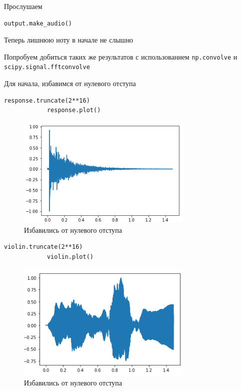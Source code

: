 \documentclass[a4paper,12pt]{article}
\begin{document}
\begin{enumerate}
		Прослушаем
		\begin{lstlisting}[caption=Прослушивание результата]
			output.make_audio()
		\end{lstlisting}
	
		Теперь лишнюю ноту в начале не слышно
		
		Попробуем добиться таких же результатов с использованием \texttt{np.convolve} и \texttt{scipy.signal.fftconvolve}
		
		Для начала, избавимся от нулевого отступа
		\begin{lstlisting}[caption=Избавляемся от нулевого отступа]
			response.truncate(2**16)
			response.plot()
		\end{lstlisting}
		\begin{figure}[H]
			\centering
			\includegraphics[width=0.75\textwidth]{1_5.png}
			\caption{Избавились от нулевого отступа}
			\label{fig:1.5}
		\end{figure}
		\begin{lstlisting}[caption=Избавляемся от нулевого отступа]
			violin.truncate(2**16)
			violin.plot()
		\end{lstlisting}
		\begin{figure}[H]
			\centering
			\includegraphics[width=0.75\textwidth]{1_6.png}
			\caption{Избавились от нулевого отступа}
			\label{fig:1.6}
		\end{figure}
		

\end{enumerate}
\end{document}
